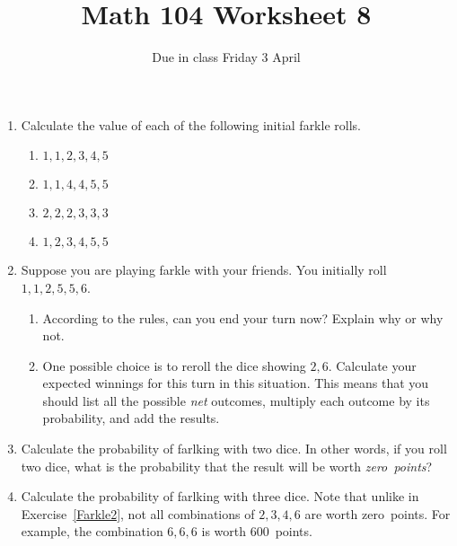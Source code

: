 \documentclass[12pt]{article}
\author{}\date{Due in class Friday 3 April}
\title{Math 104 Worksheet 8}\author{}
\begin{document}
\maketitle
\thispagestyle{empty}
\begin{enumerate}
\item Calculate the value of each of the following
initial farkle rolls.
\begin{enumerate}
\item $1,1,2,3,4,5$
\item $1,1,4,4,5,5$
\item $2,2,2,3,3,3$
\item $1,2,3,4,5,5$
\end{enumerate}

\item Suppose you are playing farkle with your
friends. You initially roll $1,1,2,5,5,6$.
\begin{enumerate}
\item According to the rules, can you end your turn now?
Explain why or why not.
\vspace{1cm}
\item One possible choice is to reroll the dice showing $2,6$.
Calculate your expected winnings for this turn in
this situation.
This means that you should list all the possible {\em net}
outcomes, multiply each outcome by its probability,
and add the results.
\vspace{3cm}
\end{enumerate}

\item\label{Farkle2}
Calculate the probability of farlking with two dice.
In other words, if you roll two dice,
what is the probability that the result will be
worth {\em zero~points}?
\vspace{1in}
\item Calculate the probability of farlking with three dice.
Note that unlike in Exercise~\ref{Farkle2},
not all combinations
of $2,3,4,6$ are worth zero~points. For example, the
combination $6,6,6$ is worth 600~points.
\end{enumerate}
\end{document}
